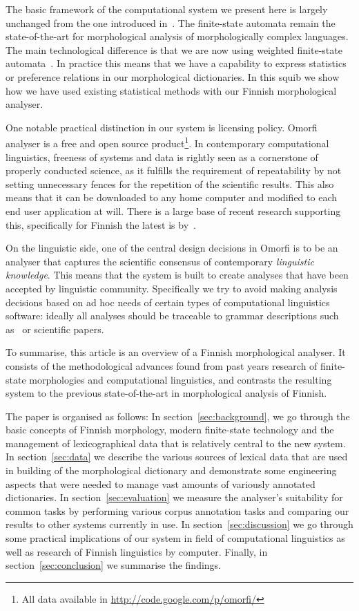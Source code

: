 \documentclass[a4paper,12pt]{article}
\begin{document}
The basic framework of the computational system we present here is largely
unchanged from the one introduced in~\citet{koskenniemi1983twolevel}. 
The finite-state automata remain the state-of-the-art for morphological analysis
of morphologically complex languages. The main
technological difference is that we are now using weighted finite-state 
automata~\citep{openfst}. In practice this means that we have a capability to
express statistics or preference relations in our morphological dictionaries.
In this squib we show how we have used existing statistical methods with
our Finnish morphological analyser.

One notable practical distinction in our system is licensing policy. Omorfi
analyser is a free and open source product\footnote{All data available in
\url{http://code.google.com/p/omorfi/}}.  In contemporary computational
linguistics, freeness of systems and data is rightly seen as a cornerstone of
properly conducted science, as it fulfills the requirement of repeatability by
not setting unnecessary fences for the repetition of the scientific results.
This also means that it can be downloaded to any home computer and modified to
each end user application at will. There is a large base of recent research
supporting this, specifically for Finnish the latest is
by~\citet{koskenniemi2008build}.

On the linguistic side, one of the central design decisions in Omorfi is to be
an analyser that captures the scientific consensus of contemporary
\emph{linguistic knowledge}.  This means that the system is built to create
analyses that have been accepted by linguistic community. Specifically we try
to avoid making analysis decisions based on ad hoc needs of certain types of
computational linguistics software: ideally all analyses should be traceable to
grammar descriptions such as~\citet{visk} or scientific papers.

To summarise, this article is an overview of a Finnish morphological analyser.
It consists of the methodological advances found from past years research of
finite-state morphologies and computational linguistics, and contrasts the
resulting system to the previous state-of-the-art in morphological analysis of
Finnish.

The paper is organised as follows: In section~\ref{sec:background}, we go
through the basic concepts of Finnish morphology, modern finite-state
technology and the management of lexicographical data that is relatively
central to the new system. In section~\ref{sec:data} we describe the various
sources of lexical data that are used in building of the morphological
dictionary and demonstrate some engineering aspects that were needed to manage
vast amounts of variously annotated dictionaries. In
section~\ref{sec:evaluation} we measure the analyser's suitability for common
tasks by performing various corpus annotation tasks and comparing our results
to other systems currently in use. In section~\ref{sec:discussion} we go
through some practical implications of our system in field of computational
linguistics as well as research of Finnish linguistics by computer. Finally, in
section~\ref{sec:conclusion} we summarise the findings.
\end{document}
